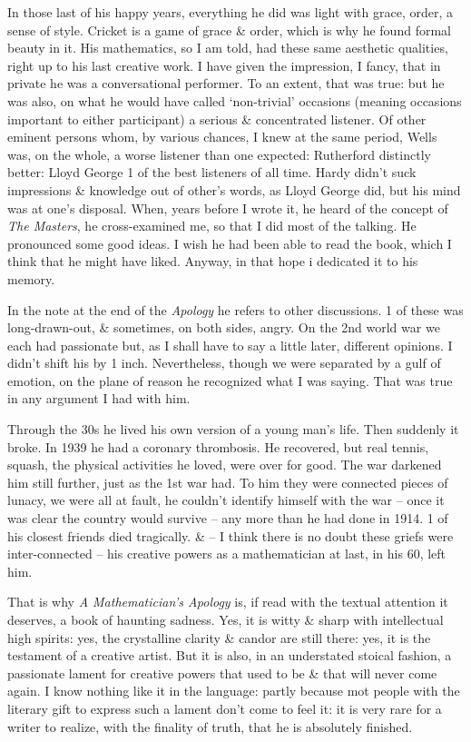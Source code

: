 \documentclass{article}
\numberwithin{equation}{section}
\begin{document}
In those last of his happy years, everything he did was light with grace, order, a sense of style. Cricket is a game of grace \& order, which is why he found formal beauty in it. His mathematics, so I am told, had these same aesthetic qualities, right up to his last creative work. I have given the impression, I fancy, that in private he was a conversational performer. To an extent, that was true: but he was also, on what he would have called `non-trivial' occasions (meaning occasions important to either participant) a serious \& concentrated listener. Of other eminent persons whom, by various chances, I knew at the same period, Wells was, on the whole, a worse listener than one expected: Rutherford distinctly better: Lloyd George 1 of the best listeners of all time. Hardy didn't suck impressions \& knowledge out of other's words, as Lloyd George did, but his mind was at one's disposal. When, years before I wrote it, he heard of the concept of \textit{The Masters}, he cross-examined me, so that I did most of the talking. He pronounced some good ideas. I wish he had been able to read the book, which I think that he might have liked. Anyway, in that hope i dedicated it to his memory.

In the note at the end of the \textit{Apology} he refers to other discussions. 1 of these was long-drawn-out, \& sometimes, on both sides, angry. On the 2nd world war we each had passionate but, as I shall have to say a little later, different opinions. I didn't shift his by 1 inch. Nevertheless, though we were separated by a gulf of emotion, on the plane of reason he recognized what I was saying. That was true in any argument I had with him.

Through the 30s he lived his own version of a young man's life. Then suddenly it broke. In 1939 he had a coronary thrombosis. He recovered, but real tennis, squash, the physical activities he loved, were over for good. The war darkened him still further, just as the 1st war had. To him they were connected pieces of lunacy, we were all at fault, he couldn't identify himself with the war -- once it was clear the country would survive -- any more than he had done in 1914. 1 of his closest friends died tragically. \& -- I think there is no doubt these griefs were inter-connected -- his creative powers as a mathematician at last, in his 60, left him.

That is why \textit{A Mathematician's Apology} is, if read with the textual attention it deserves, a book of haunting sadness. Yes, it is witty \& sharp with intellectual high spirits: yes, the crystalline clarity \& candor are still there: yes, it is the testament of a creative artist. But it is also, in an understated stoical fashion, a passionate lament for creative powers that used to be \& that will never come again. I know nothing like it in the language: partly because mot people with the literary gift to express such a lament don't come to feel it: it is very rare for a writer to realize, with the finality of truth, that he is absolutely finished.
\end{document}

